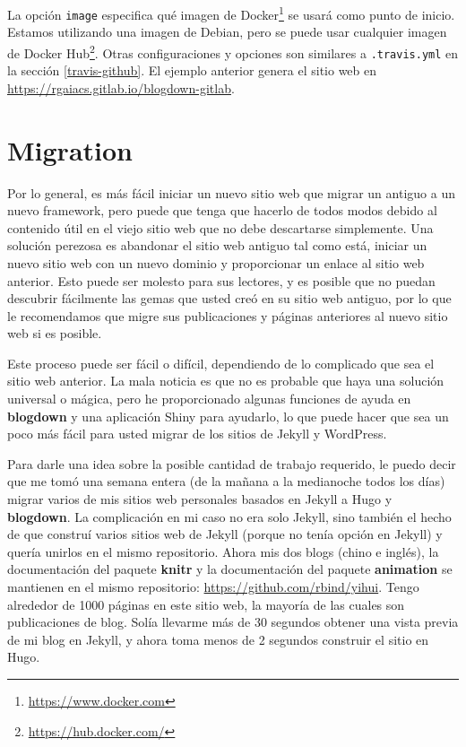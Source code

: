 \documentclass[12pt,]{krantz}
\renewcommand{\href}[2]{#2\footnote{\url{#1}}}
\theoremstyle{definition}
\theoremstyle{definition}
\theoremstyle{definition}
\theoremstyle{remark}
\begin{document}
La opción \texttt{image} especifica qué imagen de
\href{https://www.docker.com}{Docker} se usará como punto de inicio.
Estamos utilizando una imagen de Debian, pero se puede usar cualquier
imagen de \href{https://hub.docker.com/}{Docker Hub}. Otras
configuraciones y opciones son similares a \texttt{.travis.yml} en la
sección \ref{travis-github}. El ejemplo anterior genera el sitio web en
\url{https://rgaiacs.gitlab.io/blogdown-gitlab}.

\hypertarget{migration}{%
\chapter{Migration}\label{migration}}

Por lo general, es más fácil iniciar un nuevo sitio web que
migrar un antiguo a un nuevo framework, pero
puede que tenga que hacerlo de todos modos debido al contenido útil en
el viejo sitio web que no debe descartarse simplemente. Una solución
perezosa es abandonar el sitio web antiguo tal como está, iniciar un
nuevo sitio web con un nuevo dominio y proporcionar un enlace al sitio
web anterior. Esto puede ser molesto para sus lectores, y es posible que
no puedan descubrir fácilmente las gemas que usted creó en su sitio web
antiguo, por lo que le recomendamos que migre sus publicaciones y
páginas anteriores al nuevo sitio web si es posible.

Este proceso puede ser fácil o difícil, dependiendo de lo complicado que
sea el sitio web anterior. La mala noticia es que no es probable que
haya una solución universal o mágica, pero he proporcionado algunas
funciones de ayuda en \textbf{blogdown} y una aplicación Shiny para
ayudarlo, lo que puede hacer que sea un poco más fácil para usted migrar
de los sitios de Jekyll y WordPress.

Para darle una idea sobre la posible cantidad de trabajo requerido, le
puedo decir que me tomó una semana entera (de la mañana a la medianoche
todos los días) migrar varios de mis sitios web personales basados en
Jekyll a Hugo y \textbf{blogdown}. La complicación en mi caso no era
solo Jekyll, sino también el hecho de que construí varios sitios web de
Jekyll (porque no tenía opción en Jekyll) y quería unirlos en el mismo
repositorio. Ahora mis dos blogs (chino e inglés), la documentación del
paquete \textbf{knitr} \citep{R-knitr} y la documentación del paquete
\textbf{animation} \citep{R-animation} se mantienen en el mismo
repositorio: \url{https://github.com/rbind/yihui}. Tengo alrededor de
1000 páginas en este sitio web, la mayoría de las cuales son
publicaciones de blog. Solía llevarme más de 30 segundos obtener una
vista previa de mi blog en Jekyll, y ahora toma menos de 2 segundos
construir el sitio en Hugo.
\end{document}
